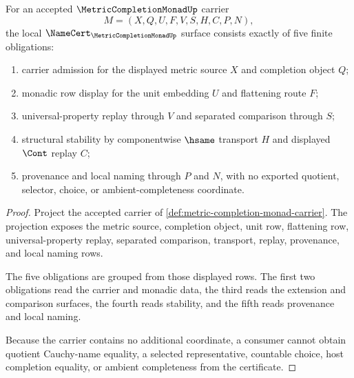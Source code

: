 \begin{theorem}
\label{thm:metric-completion-monad-namecert-obligations}
For an accepted $\MetricCompletionMonadUp$ carrier
$$
M=(X,Q,U,F,V,S,H,C,P,N),
$$
the local $\NameCert_{\MetricCompletionMonadUp}$ surface consists exactly of five finite obligations:
\begin{enumerate}
\item carrier admission for the displayed metric source $X$ and completion object $Q$;
\item monadic row display for the unit embedding $U$ and flattening route $F$;
\item universal-property replay through $V$ and separated comparison through $S$;
\item structural stability by componentwise $\hsame$ transport $H$ and displayed $\Cont$ replay $C$;
\item provenance and local naming through $P$ and $N$, with no exported quotient, selector, choice, or ambient-completeness coordinate.
\end{enumerate}
\end{theorem}
\begin{proof}
Project the accepted carrier of \autoref{def:metric-completion-monad-carrier}. The projection exposes the metric source, completion object, unit row, flattening row, universal-property replay, separated comparison, transport, replay, provenance, and local naming rows.

The five obligations are grouped from those displayed rows. The first two obligations read the carrier and monadic data, the third reads the extension and comparison surfaces, the fourth reads stability, and the fifth reads provenance and local naming.

Because the carrier contains no additional coordinate, a consumer cannot obtain quotient Cauchy-name equality, a selected representative, countable choice, host completion equality, or ambient completeness from the certificate.
\end{proof}

